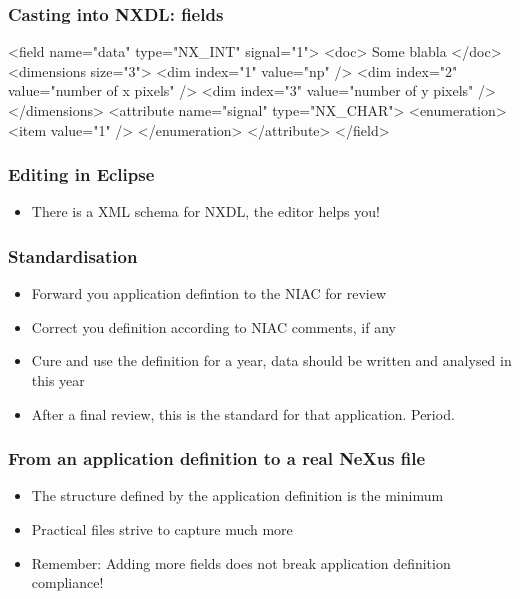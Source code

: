 \documentclass{beamer}
\begin{document}
\begin{frame}[fragile]
\frametitle{Casting into NXDL: fields}
\begin{semiverbatim}
<field name="data" type="NX_INT" signal="1">
     <doc>
       Some blabla
     </doc>
     <dimensions size="3">
         <dim index="1" value="np" />
         <dim index="2" value="number of x pixels" />
         <dim index="3" value="number of y pixels" />
     </dimensions>
     <attribute name="signal" type="NX_CHAR">
         <enumeration>
            <item value="1" />
          </enumeration>
      </attribute>
</field>
\end{semiverbatim}
\end{frame}

\begin{frame} \frametitle{Editing in Eclipse}
\begin{itemize}
\item There is a XML schema for NXDL, the editor helps you! 
\end{itemize}
\end{frame}

\begin{frame}
\frametitle{Standardisation}
\begin{itemize}
\item Forward you application defintion to the NIAC for review
\item Correct you definition according to NIAC comments, if any
\item Cure and use the definition for a year, data should be written and analysed in this year
\item After a final review, this is the standard for that application. Period. 
\end{itemize}
\end{frame}

\begin{frame}
\frametitle{From an application definition to a real NeXus file}
\begin{itemize}
\item<1->The structure defined by the application definition is the minimum
\item<2->Practical files strive to capture much more
\item<4-> Remember: {\color{red}Adding more fields does not break application definition compliance!} 
\end{itemize}
\end{frame}
\end{document}
